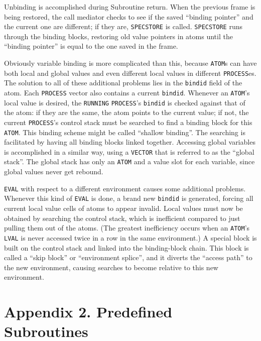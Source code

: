 \documentclass[a4paper,]{article}
\begin{document}
Unbinding is accomplished during Subroutine return. When the previous frame is being restored, the call mediator checks to
see if the saved ``binding pointer'' and the current one are different; if they are, \texttt{SPECSTORE} is called.
\texttt{SPECSTORE} runs through the binding blocks, restoring old value pointers in atoms until the ``binding pointer'' is
equal to the one saved in the frame.

Obviously variable binding is more complicated than this, because \texttt{ATOM}s can have both local and global values and
even different local values in different \texttt{PROCESS}es. The solution to all of these additional problems lies in the
\texttt{bindid} field of the atom. Each \texttt{PROCESS} vector also contains a current \texttt{bindid}. Whenever an
\texttt{ATOM}'s local value is desired, the \texttt{RUNNING} \texttt{PROCESS}'s \texttt{bindid} is checked against that of
the atom: if they are the same, the atom points to the current value; if not, the current \texttt{PROCESS}'s control stack
must be searched to find a binding block for this \texttt{ATOM}. This binding scheme might be called ``shallow binding''.
The searching is facilitated by having all binding blocks linked together. Accessing global variables is accomplished in a
similar way, using a \texttt{VECTOR} that is referred to as the ``global stack''. The global stack has only an
\texttt{ATOM} and a value slot for each variable, since global values never get rebound.

\texttt{EVAL} with respect to a different environment causes some additional problems. Whenever this kind of \texttt{EVAL}
is done, a brand new \texttt{bindid} is generated, forcing all current local value cells of atoms to appear invalid. Local
values must now be obtained by searching the control stack, which is inefficient compared to just pulling them out of the
atoms. (The greatest inefficiency occurs when an \texttt{ATOM}'s \texttt{LVAL} is never accessed twice in a row in the same
environment.) A special block is built on the control stack and linked into the binding-block chain. This block is called a
``skip block'' or ``environment splice'', and it diverts the ``access path'' to the new environment, causing searches to
become relative to this new environment.

\section{Appendix 2. Predefined Subroutines}\label{appendix-2.-predefined-subroutines}
\end{document}
